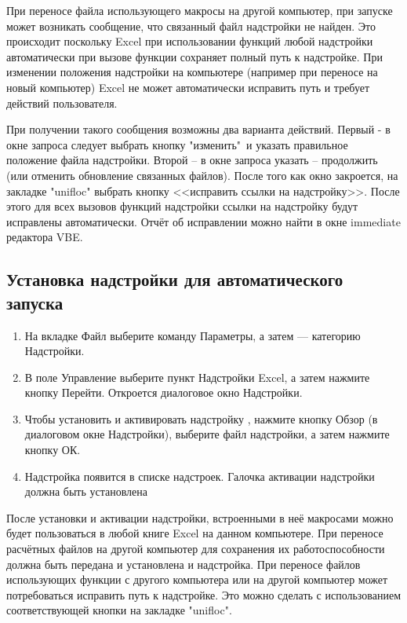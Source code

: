 При переносе файла использующего макросы \unf{} на другой компьютер, при запуске может возникать сообщение, что связанный файл надстройки не найден. Это происходит поскольку Excel при использовании функций любой надстройки автоматически при вызове функции сохраняет полный путь к надстройке. При изменении положения надстройки на компьютере (например при переносе на новый компьютер) Excel не может автоматически исправить путь и требует действий пользователя.


При получении такого сообщения возможны два варианта действий. Первый - в окне запроса следует выбрать кнопку "изменить"\ и указать правильное положение файла надстройки. Второй -- в окне запроса указать -- продолжить (или отменить обновление связанных файлов). После того как окно закроется, на закладке "unifloc" выбрать кнопку <<исправить ссылки на надстройку>>. После этого для всех вызовов функций надстройки \unf{} ссылки на надстройку будут исправлены автоматически. Отчёт об исправлении можно найти в окне immediate редактора VBE. 


\subsection{Установка надстройки для автоматического запуска}
\begin{enumerate}
	\item На вкладке Файл выберите команду Параметры, а затем — категорию Надстройки.
	\item В поле Управление выберите пункт Надстройки Excel, а затем нажмите кнопку Перейти. Откроется диалоговое окно Надстройки.
	\item Чтобы установить и активировать надстройку \unf{}, нажмите кнопку Обзор (в диалоговом окне Надстройки), выберите файл надстройки, а затем нажмите кнопку ОК.
	\item Надстройка появится в списке надстроек. Галочка активации надстройки должна быть установлена
\end{enumerate}	

После установки и активации надстройки, встроенными в неё макросами можно будет пользоваться в любой книге Excel на данном компьютере. При переносе расчётных файлов на другой компьютер для сохранения их работоспособности должна быть передана и установлена и надстройка. 
При переносе файлов использующих функции \unf{} с другого компьютера или на другой компьютер может потребоваться исправить путь к надстройке. Это можно сделать с использованием соответствующей кнопки на закладке "unifloc".


